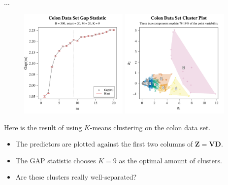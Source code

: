 \documentclass[8pt]{beamer}
\begin{document}
\begin{frame}{$\ldots$}

\begin{figure}
    \centering
    \includegraphics[width = 0.475\textwidth]{colon_gap_stat.pdf}
    \includegraphics[width = 0.475\textwidth]{colon_clus_plot.pdf}
\end{figure}

Here is the result of using $K$-means clustering on the colon data set.
\begin{itemize}
    \item The predictors are plotted against the first two columns of $\mathbf{Z} = \mathbf{V} \mathbf{D}$.
    \item The GAP statistic chooses $K=9$ as the optimal amount of clusters.
    \item Are these clusters really well-separated? %
\end{itemize}
    
\end{frame}
\end{document}
